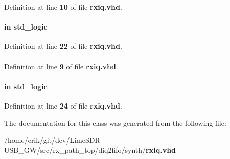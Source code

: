 Definition at line {\bf 10} of file {\bf rxiq.\+vhd}.

\paragraph[{reset\+\_\+n}]{ {\bfseries \textcolor{keywordflow}{in}\textcolor{vhdlchar}{ }} {\bfseries \textcolor{comment}{std\+\_\+logic}\textcolor{vhdlchar}{ }} \hspace{0.3cm}{\ttfamily [Port]}}\label{classrxiq_a446ea52ed8c4a84181a47d9165ce41a5}


Definition at line {\bf 22} of file {\bf rxiq.\+vhd}.

\paragraph[{std\+\_\+logic\+\_\+1164}]{\hspace{0.3cm}{\ttfamily [Package]}}\label{classrxiq_acd03516902501cd1c7296a98e22c6fcb}


Definition at line {\bf 9} of file {\bf rxiq.\+vhd}.

\paragraph[{trxiqpulse}]{ {\bfseries \textcolor{keywordflow}{in}\textcolor{vhdlchar}{ }} {\bfseries \textcolor{comment}{std\+\_\+logic}\textcolor{vhdlchar}{ }} \hspace{0.3cm}{\ttfamily [Port]}}\label{classrxiq_a808d6d382f3c6a02784a160f67d0f891}


Definition at line {\bf 24} of file {\bf rxiq.\+vhd}.



The documentation for this class was generated from the following file\+:\begin{DoxyCompactItemize}
\item 
/home/erik/git/dev/\+Lime\+S\+D\+R-\/\+U\+S\+B\+\_\+\+G\+W/src/rx\+\_\+path\+\_\+top/diq2fifo/synth/{\bf rxiq.\+vhd}\end{DoxyCompactItemize}
